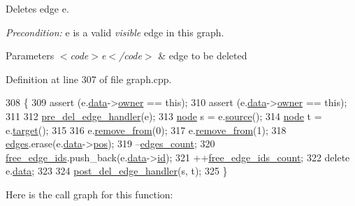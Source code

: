Deletes edge {\ttfamily e}.

{\itshape Precondition\+:} {\ttfamily e} is a valid {\itshape visible} edge in this graph.


\begin{DoxyParams}{Parameters}
{\em $<$code$>$e$<$/code$>$} & edge to be deleted \\
\hline
\end{DoxyParams}


Definition at line 307 of file graph.\+cpp.


\begin{DoxyCode}
308 \{
309     assert (e.\mbox{\hyperlink{classedge_a0ebb6dfa28b77f47529085049352b436}{data}}->\mbox{\hyperlink{classedge__data_a00436f2956a69cd9dc8e5bfa530e0ce9}{owner}} == \textcolor{keyword}{this});
310     assert (e.\mbox{\hyperlink{classedge_a0ebb6dfa28b77f47529085049352b436}{data}}->\mbox{\hyperlink{classedge__data_a00436f2956a69cd9dc8e5bfa530e0ce9}{owner}} == \textcolor{keyword}{this});
311 
312     \mbox{\hyperlink{classgraph_a2cd0986dc5bcbfdbf0635c39e610784b}{pre\_del\_edge\_handler}}(e);
313     \mbox{\hyperlink{classnode}{node}} s = e.\mbox{\hyperlink{classedge_ae82d5701f7e6f71edc3c8b0e34bcd2b7}{source}}();
314     \mbox{\hyperlink{classnode}{node}} t = e.\mbox{\hyperlink{classedge_a97563b611261478ee19c6ce055f1a3ee}{target}}();
315 
316     e.\mbox{\hyperlink{classedge_abcd4eeaf23327d026beac9ee1d0fa7e9}{remove\_from}}(0);
317     e.\mbox{\hyperlink{classedge_abcd4eeaf23327d026beac9ee1d0fa7e9}{remove\_from}}(1);
318     \mbox{\hyperlink{classgraph_ab5b1c610cca1bcf72b05aacc28a48153}{edges}}.erase(e.\mbox{\hyperlink{classedge_a0ebb6dfa28b77f47529085049352b436}{data}}->\mbox{\hyperlink{classedge__data_a178a8fd40a6ec8139291f96a7807f711}{pos}});
319     --\mbox{\hyperlink{classgraph_af560ff4263ad165c166a46084e781b4a}{edges\_count}};
320     \mbox{\hyperlink{classgraph_a2bef57ea1db5b5541b3cce866de179f0}{free\_edge\_ids}}.push\_back(e.\mbox{\hyperlink{classedge_a0ebb6dfa28b77f47529085049352b436}{data}}->\mbox{\hyperlink{classedge__data_a33597ce417f8d86697b03fc8b6fea526}{id}});
321     ++\mbox{\hyperlink{classgraph_a336be547b5e0ca43b96cf00131e0e1da}{free\_edge\_ids\_count}};
322     \textcolor{keyword}{delete} e.\mbox{\hyperlink{classedge_a0ebb6dfa28b77f47529085049352b436}{data}};
323 
324     \mbox{\hyperlink{classgraph_ab9ac8bcc7288986de69cd467beb33600}{post\_del\_edge\_handler}}(s, t);
325 \}
\end{DoxyCode}
Here is the call graph for this function\+:\nopagebreak
